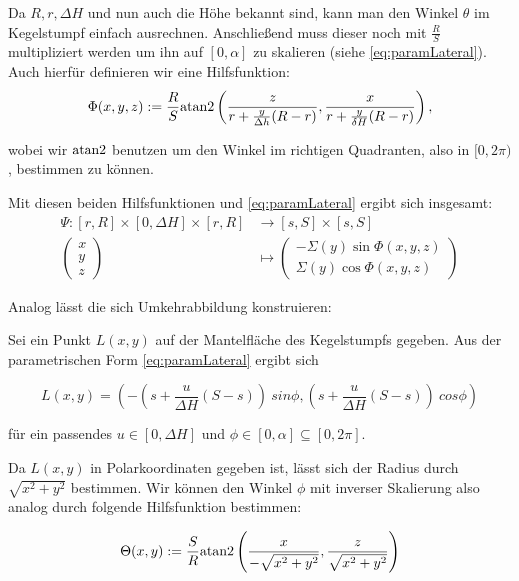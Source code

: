 Da $R, r, \Delta H$  und nun auch die Höhe bekannt sind, kann man den Winkel $\theta$ im Kegelstumpf einfach ausrechnen. Anschließend muss dieser noch mit  $\frac{R}{S}$ multipliziert werden um ihn auf $[0, \alpha]$ zu skalieren (siehe \ref{eq:paramLateral}).  Auch hierfür definieren wir eine Hilfsfunktion:
\begin{equation*}
\Phi(x,y,z) := \frac{R}{S} \text{atan2}\left(\frac{z}{r + \frac{y}{\Delta h} (R - r)}, \frac{x}{r + \frac{y}{\delta H} (R - r)}\right),
\end{equation*}

wobei wir $\text{atan2}$ benutzen um den Winkel im richtigen Quadranten, also in $[0, 2\pi)$, bestimmen zu können. 

Mit diesen beiden Hilfsfunktionen und \ref{eq:paramLateral} ergibt sich insgesamt:
\begin{equation}\label{eq:coneToLateral}
\begin{aligned}
\Psi \colon [r,R] \times [0, \Delta H] \times [r,R] &\to [s,S] \times [s,S]\\
\begin{pmatrix}
x \\ y \\ z
\end{pmatrix}  &\mapsto
\begin{pmatrix}
-\Sigma(y)\sin \Phi(x,y,z)\\
 \Sigma(y)\cos\Phi(x,y,z)
\end{pmatrix}
\end{aligned}
\end{equation}

Analog lässt die sich Umkehrabbildung konstruieren:

Sei ein Punkt $L(x,y)$ auf der Mantelfläche des Kegelstumpfs gegeben. Aus der parametrischen Form \ref{eq:paramLateral} ergibt sich

\[
L(x,y) = (-(s + \frac{u}{\Delta H}(S-s)) ~sin \phi, (s + \frac{u}{\Delta H} (S-s)) ~cos \phi)
\]

für ein passendes $u\in [0, \Delta H]$ und $\phi \in [0, \alpha] \subseteq  [0, 2\pi]$.

Da $L(x,y)$ in Polarkoordinaten gegeben ist, lässt sich der Radius durch $\sqrt{x^2+y^2}$ bestimmen. Wir können den Winkel $\phi$ mit inverser Skalierung also analog durch folgende Hilfsfunktion bestimmen:

\begin{equation*}
\Theta(x,y) := \frac{S}{R} \text{atan2}\left(\frac{x}{-\sqrt{x^2+y^2}}, \frac{z}{\sqrt{x^2+y^2}}\right)
\end{equation*}

